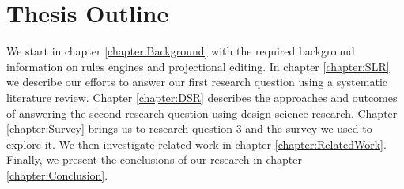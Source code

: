 \section{Thesis Outline}

We start in chapter \ref{chapter:Background} with the required background information on rules engines and projectional editing.
In chapter \ref{chapter:SLR} we describe our efforts to answer our first research question using a systematic literature review.
Chapter \ref{chapter:DSR} describes the approaches and outcomes of answering the second research question using design science research. 
Chapter \ref{chapter:Survey} brings us to research question 3 and the survey we used to explore it.
We then investigate related work in chapter \ref{chapter:RelatedWork}.
Finally, we present the conclusions of our research in chapter \ref{chapter:Conclusion}.
